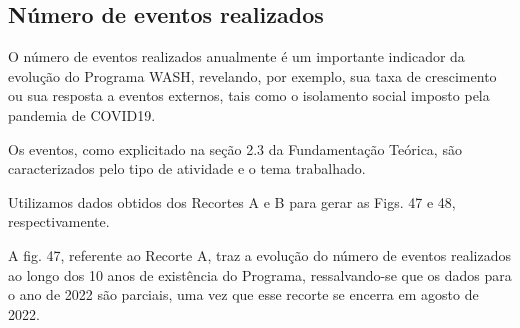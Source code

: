 \documentclass[
12pt,		%
openright,	%
twoside,  %
a4paper,			%
chapter=TITLE,		%
english,			%
french,				%
spanish,			%
brazil				%
]{USPSC-classe/USPSC}
\begin{document}
\subsection[N\'umero de eventos realizados]{N\'umero de eventos realizados}\label{N\'umero de eventos realizados}
O n\'umero de eventos realizados anualmente \'e um importante indicador da evolu\c{c}\~ao do Programa WASH, revelando, por exemplo, sua taxa de crescimento ou sua resposta a eventos externos, tais como o isolamento social imposto pela pandemia de COVID19.

















Os eventos, como explicitado na se\c{c}\~ao 2.3 da Fundamenta\c{c}\~ao Te\'orica, s\~ao caracterizados pelo tipo de atividade e o tema trabalhado.

















Utilizamos dados obtidos dos Recortes A e B para gerar as Figs. 47 e 48, respectivamente.

















A fig. 47, referente ao Recorte A, traz a evolu\c{c}\~ao do n\'umero de eventos realizados ao longo dos 10 anos de exist\^encia do Programa, ressalvando-se que os dados para o ano de 2022 s\~ao parciais, uma vez que esse recorte se encerra em agosto de 2022.
\end{document}
